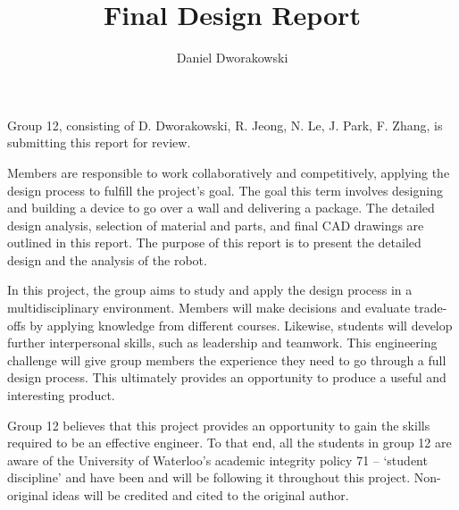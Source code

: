 \documentclass[ece]{uw-wkrpt}
\begin{document}

\title{Final Design Report}

\author{Daniel Dworakowski}
\address{University of Waterloo,\\*
        Waterloo, ON\ \ N2L 3G1}
\employeraddress{}
\maketitle

\frontmatter

\begin{letter}
Group 12, consisting of D. Dworakowski, R. Jeong, N. Le, J. Park, F. Zhang, is submitting this report for review.

Members are responsible to work collaboratively and competitively, applying the design process to fulfill the project’s goal. The goal this term involves designing and building a device to go over a wall and delivering a package. The detailed design analysis, selection of material and parts, and final CAD drawings are outlined in this report. The purpose of this report is to present the detailed design and the analysis of the robot.

In this project, the group aims to study and apply the design process in a multidisciplinary environment. Members will make decisions and evaluate trade-offs by applying knowledge from different courses. Likewise, students will develop further interpersonal skills, such as leadership and teamwork. This engineering challenge will give group members the experience they need to go through a full design process. This ultimately provides an opportunity to produce a useful and interesting product.

Group 12 believes that this project provides an opportunity to gain the skills required to be an effective engineer. To that end, all the students in group 12 are aware of the University of Waterloo’s academic integrity policy 71 – ‘student discipline’ and have been and will be following it throughout this project. Non-original ideas will be credited and cited to the original author.

\end{letter}
\end{document}
